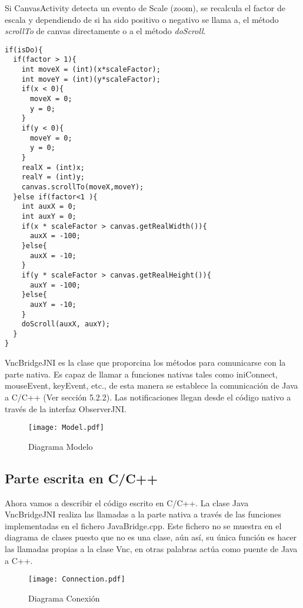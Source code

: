 Si CanvasActivity detecta un evento de Scale (zoom), se recalcula el factor de escala y dependiendo de si ha sido positivo o negativo se llama a, el método \emph{scrollTo} de canvas directamente o a el método \emph{doScroll}.
\begin{lstlisting}
if(isDo){
  if(factor > 1){		
    int moveX = (int)(x*scaleFactor);
    int moveY = (int)(y*scaleFactor);
    if(x < 0){
      moveX = 0;
      y = 0;
    }
    if(y < 0){
      moveY = 0;
      y = 0;
    }
    realX = (int)x;
    realY = (int)y;
    canvas.scrollTo(moveX,moveY);
  }else if(factor<1 ){
    int auxX = 0;
    int auxY = 0;
    if(x * scaleFactor > canvas.getRealWidth()){
      auxX = -100;
    }else{
      auxX = -10;
    }
    if(y * scaleFactor > canvas.getRealHeight()){
      auxY = -100;
    }else{
      auxY = -10;
    }
    doScroll(auxX, auxY);
  }
}
\end{lstlisting}

VncBridgeJNI es la clase que proporcina los métodos para comunicarse con la parte nativa. Es capaz de llamar a funciones nativas tales como iniConnect, mouseEvent, keyEvent, etc., de esta manera se establece la comunicación de Java a C/C++ (Ver sección 5.2.2). Las notificaciones llegan desde el código nativo a través de la interfaz ObserverJNI.

\begin{figure}[h]
\begin{center}
\texttt{[image: Model.pdf]}
\end{center}
\caption{Diagrama Modelo}
\end{figure}

\subsection{Parte escrita en C/C++}

Ahora vamos a describir el código escrito en C/C++. La clase Java VncBridgeJNI realiza las llamadas a la parte nativa a través de las funciones implementadas en el fichero JavaBridge.cpp. Este fichero no se muestra en el diagrama de clases puesto que no es una clase, aún así, su única función es hacer las llamadas propias a la clase Vnc, en otras palabras actúa como puente de Java a C++.

\begin{figure}[h]
\begin{center}
\texttt{[image: Connection.pdf]}
\end{center}
\caption{Diagrama Conexión}
\end{figure}

